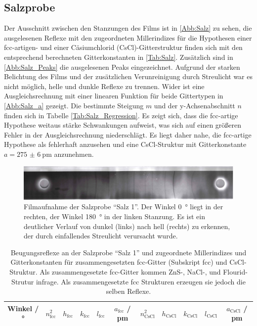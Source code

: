 \subsection{Salzprobe}
Der Ausschnitt zwischen den Stanzungen des Films ist in \autoref{Abb:Salz}
zu sehen, die ausgelesenen Reflexe mit den zugeordneten Millerindizes für die
Hypothesen einer fcc-artigen- und einer Cäsiumchlorid (CsCl)-Gitterstruktur finden sich mit den entsprechend
berechneten Gitterkonstanten in \autoref{Tab:Salz}.
Zusätzlich sind in \autoref{Abb:Salz_Peaks} die ausgelesenen Peaks eingezeichnet.
Aufgrund der starken Belichtung des Films und der zusätzlichen Verunreinigung durch Streulicht
war es nicht möglich, helle und dunkle Reflexe zu trennen.
Wider ist eine Ausgleichsrechnung mit einer linearen Funktion für beide Gittertypen in
\autoref{Abb:Salz_a} gezeigt. Die bestimmte Steigung $m$ und der y-Achsenabschnitt $n$
finden sich in Tabelle \autoref{Tab:Salz_Regression}.
Es zeigt sich, dass die fcc-artige Hypothese weitaus stärke Schwankungen aufweist, was
sich auf einen größeren Fehler in der Ausgleichsrechnung niederschlägt.
Es liegt daher nahe, die fcc-artige Hypothese als fehlerhaft anzusehen und eine CsCl-Struktur
mit Gitterkonstante $a=\SI{275(6)}{\pico\metre}$ anzunehmen.

\begin{figure}
  \centering
  \includegraphics[scale=0.5]{content/pics/Salz_film.pdf}
  \caption{Filmaufnahme der Salzprobe \enquote{Salz 1}. Der Winkel \SI{0}{\degree} liegt in der
  rechten, der Winkel \SI{180}{\degree} in der linken Stanzung. Es ist ein
  deutlicher Verlauf von dunkel (links) nach hell (rechts) zu erkennen, der durch
  einfallendes Streulicht verursacht wurde.}
  \label{Abb:Salz}
\end{figure}

\begin{table}[H]
  \centering
  \caption{Beugungsreflexe an der Salzprobe \enquote{Salz 1} und zugeordnete Millerindizes und Gitterkonstanten
  für zusammengesetzten fcc-Gitter (Subskript fcc) und CsCl-Struktur. Als zusammengesetzte
  fcc-Gitter kommen ZnS-, NaCl-, und Flourid-Strutur infrage. Als zusammengesetzte
  fcc Strukturen erzeugen sie jedoch die selben Reflexe.}
  \label{Tab:Salz}
  \begin{tabular}{c || c c c c c|c c c c c}
    \toprule
    Winkel / ° &
    $n_{\text{fcc}}^{2}$ &
    $h_{\text{fcc}}$ &
    $k_{\text{fcc}}$ &
    $l_{\text{fcc}}$ &
    $a_{\text{fcc}}$ / pm &
    $n_{\text{CsCl}}^{2}$ &
    $h_{\text{CsCl}}$ &
    $k_{\text{CsCl}}$ &
    $l_{\text{CsCl}}$ &
    $a_{\text{CsCl}}$ / pm \\
    \midrule
    
    \bottomrule
  \end{tabular}
\end{table}

